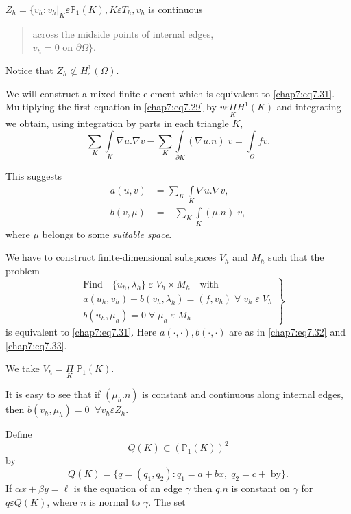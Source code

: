$Z_h=\{v_h:v_h|_K\varepsilon\mathbb{P}_1(K),K\varepsilon
T_h,v_h$ is continuous 
\begin{quote}
across the midside points of internal edges,\\
$v_h=0$ on $\partial\Omega\}$. 
\end{quote}

Notice that $Z_h\nsubset H_\circ^1(\Omega)$.

We will construct a mixed finite element which is equivalent to
\eqref{chap7:eq7.31}. Multiplying the first equation in
\eqref{chap7:eq7.29} by $v\varepsilon\underset{K}{\Pi} H^1(K)$ and
integrating we obtain, using integration by parts in each triangle
$K$, 
$$
\sum\limits_K\int\limits_K\nabla u.\nabla v-\sum\limits_K
\int\limits_{\partial K}(\nabla u.n)\;v=\int\limits_\Omega fv.
$$

This suggests 
\begin{align}
a(u,v) &= \sum\limits_K\int\limits_K\nabla u.\nabla
v,\label{chap7:eq7.32}\\ 
b(v,\mu) &= -\sum\limits_K\int\limits_K(\mu.n)\;
v, \label{chap7:eq7.33} 
\end{align}
where $\mu$ belongs to some \emph{suitable space}.

We have to construct finite-dimensional subspaces $V_h$ and $M_h$ such
that the problem 
\begin{equation}\label{chap7:eq7.34}
\left.
\begin{aligned}
&\text{Find}\quad\{u_h,\lambda_h\}\;\varepsilon \;V_h\times M_h
\quad\text{with}\\
&a(u_h,v_h)+b(v_h,\lambda_h)=(f,v_h)\;\forall \;v_h \;\varepsilon
\;V_h\\
&b(u_h,\mu_h)=0\;\forall \;\mu_h\;\varepsilon \;M_h
\end{aligned}
\right\}
\end{equation}\pageoriginale 
is equivalent to \eqref{chap7:eq7.31}. Here $a(\cdotp,\cdotp),
b(\cdotp,\cdotp)$ are as in \eqref{chap7:eq7.32} and
\eqref{chap7:eq7.33}.

We take $V_h=\underset{K}{\Pi}\;\mathbb{P}_1(K)$.

It is easy to see that if $(\mu_h.n)$ is constant and continuous along
internal edges, then $b(v_h,\mu_h)=0 \;\; \forall v_h\varepsilon Z_h$. 

Define 
$$
Q(K)\subset(\mathbb{P}_1(K))^2
$$
by 
$$
Q(K)=\{q=(q_1,q_2):q_1=a+bx,\;q_2=c+\;\text{by}\}.
$$
If $\alpha x+\beta y=\ell$ is the equation of an edge $\gamma$ then
$q.n$ is constant on $\gamma$ for $q\varepsilon Q(K)$, where $n$ is
normal to $\gamma$. The set 

